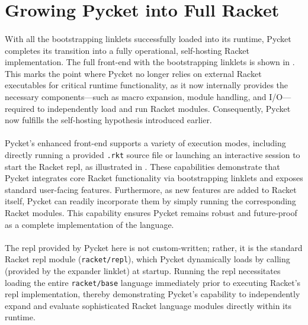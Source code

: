 	\section[\texorpdfstring{Growing Pycket into Full Racket}{Pycket as Full Racket}]{Growing Pycket into Full Racket}


		\paragraph{}%
			With all the bootstrapping linklets successfully loaded into its runtime, Pycket completes its transition into a fully operational, self-hosting Racket implementation. The full front-end with the bootstrapping linklets is shown in . This marks the point where Pycket no longer relies on external Racket executables for critical runtime functionality, as it now internally provides the necessary components—such as macro expansion, module handling, and I/O—required to independently load and run Racket modules. Consequently, Pycket now fulfills the self-hosting hypothesis introduced earlier.


		\paragraph{}%
			Pycket's enhanced front-end supports a variety of execution modes, including directly running a provided \texttt{.rkt} source file or launching an interactive session to start the Racket \gls{repl}, as illustrated in . These capabilities demonstrate that Pycket integrates core Racket functionality via bootstrapping linklets and exposes standard user-facing features. Furthermore, as new features are added to Racket itself, Pycket can readily incorporate them by simply running the corresponding Racket modules. This capability ensures Pycket remains robust and future-proof as a complete implementation of the language.

		\paragraph{}%
			The \gls{repl} provided by Pycket here is not custom-written; rather, it is the standard Racket \gls{repl} module (\texttt{racket/repl}), which Pycket dynamically loads by calling  (provided by the expander linklet) at startup. Running the \gls{repl} necessitates loading the entire \texttt{racket/base} language immediately prior to executing Racket’s \gls{repl} implementation, thereby demonstrating Pycket's capability to independently expand and evaluate sophisticated Racket language modules directly within its runtime.


